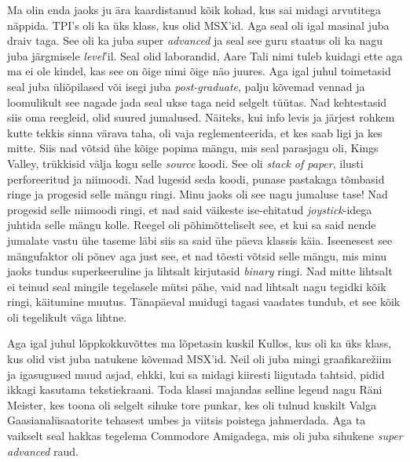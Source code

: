 Ma olin enda jaoks ju ära kaardistanud kõik kohad, kus sai midagi arvutitega 
näppida. TPI's oli ka üks klass, kus olid 
MSX'id. Aga seal oli igal masinal juba draiv taga. 
See oli ka juba super \emph{advanced} ja seal see guru staatus oli ka nagu juba 
järgmisele \emph{level}'il. Seal olid  laborandid, Aare Tali nimi tuleb kuidagi ette aga ma ei ole kindel, kas see on õige nimi õige 
näo juures. Aga igal juhul toimetasid seal juba 
üliõpilased või isegi juba \emph{post-graduate},  palju kõvemad vennad ja 
loomulikult see nagade jada seal ukse taga neid selgelt tüütas. Nad kehtestasid 
siis oma  reegleid, olid suured jumalused. Näiteks, kui info levis ja järjest 
rohkem kutte tekkis sinna värava taha,  oli vaja reglementeerida, et kes saab 
ligi ja kes mitte. Siis nad võtsid ühe kõige popima mängu, mis seal parasjagu 
oli, Kings Valley, trükkisid välja kogu selle 
\emph{source} koodi. See oli \emph{stack of paper}, ilusti perforeeritud ja 
niimoodi. Nad lugesid seda koodi, punase pastakaga tõmbasid ringe ja progesid 
selle mängu ringi. Minu jaoks oli see nagu jumaluse tase! Nad progesid selle 
niimoodi ringi, et nad said väikeste ise-ehitatud \emph{joystick}-idega juhtida 
selle mängu kolle. Reegel oli põhimõtteliselt see, et kui sa said nende 
jumalate vastu ühe taseme läbi siis sa said ühe päeva klassis käia. Iseenesest 
see mängufaktor  oli põnev aga just see, et nad tõesti võtsid selle mängu, mis 
minu jaoks tundus superkeeruline ja lihtsalt kirjutasid \emph{binary} ringi. 
Nad mitte lihtsalt ei teinud seal mingile tegelasele mütsi pähe,  vaid nad 
lihtsalt nagu tegidki kõik ringi, käitumine muutus. Tänapäeval muidugi tagasi 
vaadates tundub, et see kõik oli tegelikult väga lihtne.


Aga igal juhul lõppkokkuvõttes ma lõpetasin kuskil Kullos, kus oli 
ka üks klass, kus olid vist juba natukene kõvemad MSX'id. Neil oli juba  mingi graafikarežiim ja igasugused muud asjad, ehkki, kui 
sa midagi kiiresti liigutada tahtsid, pidid ikkagi kasutama tekstiekraani. Toda 
klassi majandas selline legend nagu Räni Meister, kes 
toona oli selgelt sihuke tore punkar, kes oli tulnud kuskilt Valga 
Gaasianalüsaatorite tehasest umbes ja viitsis poistega jahmerdada. Aga ta 
vaikselt seal hakkas tegelema Commodore 
Amigadega, mis oli juba sihukene 
\emph{super advanced} raud. 

